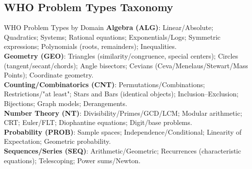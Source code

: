 \documentclass{article}
\begin{document}
\subsection*{WHO Problem Types Taxonomy}
\begin{classifybox}{WHO Problem Types by Domain}
\textbf{Algebra (ALG)}: Linear/Absolute; Quadratics; Systems; Rational equations; Exponentials/Logs; Symmetric expressions; Polynomials (roots, remainders); Inequalities.\\
\textbf{Geometry (GEO)}: Triangles (similarity/congruence, special centers); Circles (tangent/secant/chords); Angle bisectors; Cevians (Ceva/Menelaus/Stewart/Mass Points); Coordinate geometry.\\
\textbf{Counting/Combinatorics (CNT)}: Permutations/Combinations; Restrictions/"at least"; Stars and Bars (identical objects); Inclusion–Exclusion; Bijections; Graph models; Derangements.\\
\textbf{Number Theory (NT)}: Divisibility/Primes/GCD/LCM; Modular arithmetic; CRT; Euler/FLT; Diophantine equations; Digit/base problems.\\
\textbf{Probability (PROB)}: Sample spaces; Independence/Conditional; Linearity of Expectation; Geometric probability.\\
\textbf{Sequences/Series (SEQ)}: Arithmetic/Geometric; Recurrences (characteristic equations); Telescoping; Power sums/Newton.
\end{classifybox}

\newpage
\end{document}
